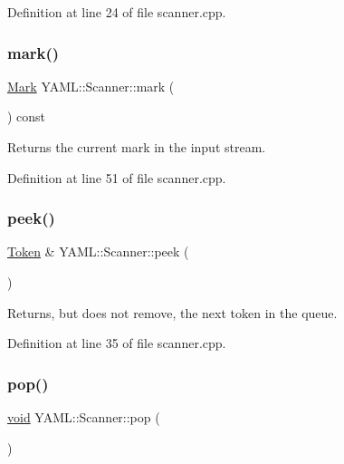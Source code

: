 Definition at line 24 of file scanner.\+cpp.

\mbox{\label{class_y_a_m_l_1_1_scanner_ac2ea7a607ea1d3e96dfbf090b0c29e0a}} 
\subsubsection{\texorpdfstring{mark()}{mark()}}
{\footnotesize\ttfamily \mbox{\hyperlink{struct_y_a_m_l_1_1_mark}{Mark}} Y\+A\+M\+L\+::\+Scanner\+::mark (\begin{DoxyParamCaption}{ }\end{DoxyParamCaption}) const}

Returns the current mark in the input stream. 

Definition at line 51 of file scanner.\+cpp.

\mbox{\label{class_y_a_m_l_1_1_scanner_a65433ee930cad573a7f82da86f91c80d}} 
\subsubsection{\texorpdfstring{peek()}{peek()}}
{\footnotesize\ttfamily \mbox{\hyperlink{struct_y_a_m_l_1_1_token}{Token}} \& Y\+A\+M\+L\+::\+Scanner\+::peek (\begin{DoxyParamCaption}{ }\end{DoxyParamCaption})}

Returns, but does not remove, the next token in the queue. 

Definition at line 35 of file scanner.\+cpp.

\mbox{\label{class_y_a_m_l_1_1_scanner_a59105995d1326628b33b330299e5db4e}} 
\subsubsection{\texorpdfstring{pop()}{pop()}}
{\footnotesize\ttfamily \mbox{\hyperlink{glad_8h_a950fc91edb4504f62f1c577bf4727c29}{void}} Y\+A\+M\+L\+::\+Scanner\+::pop (\begin{DoxyParamCaption}{ }\end{DoxyParamCaption})}


